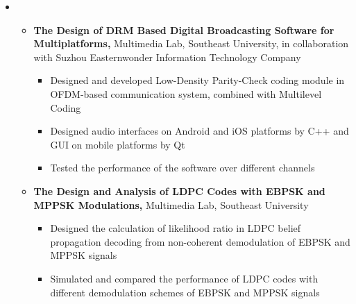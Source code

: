 \documentclass[11pt,a4paper,sans]{moderncv}        %
\makeatletter
\renewcommand*{\bibliographyitemlabel}{\@biblabel{\arabic{enumiv}}}
\makeatother
\begin{document}
\begin{itemize}
	
\item{}

\begin{itemize}
\item{\textbf{The Design of DRM Based Digital Broadcasting Software for Multiplatforms,} Multimedia Lab, Southeast University, in collaboration with Suzhou Easternwonder Information Technology Company

\vspace{3pt}

\begin{itemize}
	\item{Designed and developed Low-Density Parity-Check coding module in OFDM-based communication system, combined with Multilevel Coding}
	\item{Designed audio interfaces on Android and iOS platforms by C++ and GUI on mobile platforms by Qt}
	\item{Tested the performance of the software over different channels}
\end{itemize}
}

\vspace{6pt}

\item{\textbf{The Design and Analysis of LDPC Codes with EBPSK and MPPSK Modulations,} Multimedia Lab, Southeast University

\vspace{3pt}

\begin{itemize}
	\item{Designed the calculation of likelihood ratio in LDPC belief propagation decoding from non-coherent demodulation of EBPSK and MPPSK signals}
	\item{Simulated and compared the performance of LDPC codes with different demodulation schemes of EBPSK and MPPSK signals}
	 
\end{itemize}

}


\end{itemize}%

\end{itemize}%

\nocite{*}

\end{document}
